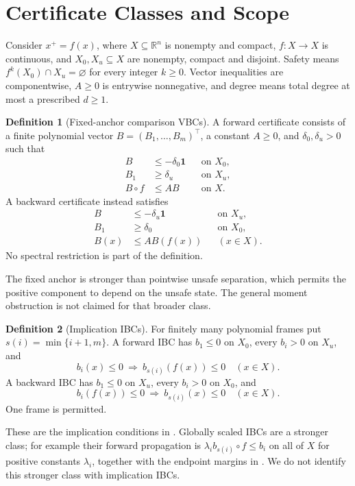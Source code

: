 \documentclass[journal,10pt]{IEEEtran}
\theoremstyle{definition}\newtheorem{definition}{Definition}
\theoremstyle{remark}
\newcommand{\R}{\mathbb R}
\newcommand{\one}{\mathbf 1}
\begin{document}
\section{Certificate Classes and Scope}\label{sec:classes}
Consider $x^+=f(x)$, where $X\subseteq\R^n$ is nonempty and compact, $f:X\to X$ is continuous, and $X_0,X_u\subseteq X$ are nonempty, compact and disjoint. Safety means $f^k(X_0)\cap X_u=\varnothing$ for every integer $k\geq0$. Vector inequalities are componentwise, $A\geq0$ is entrywise nonnegative, and degree means total degree at most a prescribed $d\geq1$.

\begin{definition}[Fixed-anchor comparison VBCs]\label{def:vbc}
A forward certificate consists of a finite polynomial vector $B=(B_1,\ldots,B_m)^\top$, a constant $A\geq0$, and $\delta_0,\delta_u>0$ such that
\begin{equation}\label{eq:ordinary}
\begin{aligned}
 B&\leq-\delta_0\one &&\text{on }X_0,\\
 B_1&\geq\delta_u &&\text{on }X_u,\\
 B\circ f&\leq AB &&\text{on }X.
\end{aligned}
\end{equation}
A backward certificate instead satisfies
\begin{equation}\label{eq:backward}
\begin{aligned}
 B&\leq-\delta_u\one &&\text{on }X_u,\\
 B_1&\geq\delta_0 &&\text{on }X_0,\\
 B(x)&\leq AB(f(x)) &&(x\in X).
\end{aligned}
\end{equation}
No spectral restriction is part of the definition.
\end{definition}
The fixed anchor is stronger than pointwise unsafe separation, which permits the positive component to depend on the unsafe state. The general moment obstruction is not claimed for that broader class.

\begin{definition}[Implication IBCs]\label{def:ibc}
For finitely many polynomial frames put $s(i)=\min\{i+1,m\}$. A forward IBC has $b_1\leq0$ on $X_0$, every $b_i>0$ on $X_u$, and
\[
 b_i(x)\leq0\ \Longrightarrow\ b_{s(i)}(f(x))\leq0\quad(x\in X).
\]
A backward IBC has $b_1\leq0$ on $X_u$, every $b_i>0$ on $X_0$, and
\[
 b_i(f(x))\leq0\ \Longrightarrow\ b_{s(i)}(x)\leq0\quad(x\in X).
\]
One frame is permitted.
\end{definition}
These are the implication conditions in \cite{ibc,submission}. Globally scaled IBCs are a stronger class; for example their forward propagation is $\lambda_i b_{s(i)}\circ f\leq b_i$ on all of $X$ for positive constants $\lambda_i$, together with the endpoint margins in \cite{submission}. We do not identify this stronger class with implication IBCs.
\end{document}
